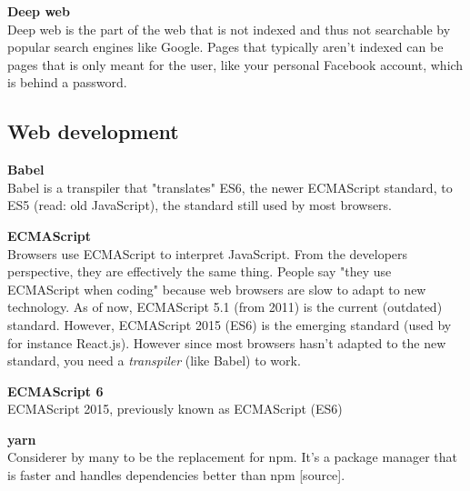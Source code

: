 \textbf{Deep web} \\
Deep web is the part of the web that is not indexed and thus not searchable by popular search engines like Google. Pages that typically aren't indexed can be pages that is only meant for the user, like your personal Facebook account, which is behind a password.

\subsection{Web development}                                %
\textbf{Babel} \\
Babel is a transpiler that "translates" ES6, the newer ECMAScript standard, to ES5 (read: old JavaScript), the standard still used by most browsers. 

\textbf{ECMAScript} \\
Browsers use ECMAScript to interpret JavaScript. From the developers perspective, they are effectively the same thing. People say "they use ECMAScript when coding" because web browsers are slow to adapt to new technology. As of now, ECMAScript 5.1 (from 2011) is the current (outdated) standard. However, ECMAScript 2015 (ES6) is the emerging standard (used by for instance React.js). However since most browsers hasn't adapted to the new standard, you need a \textit{transpiler} (like Babel) to work.  

\textbf{ECMAScript 6 } \\
ECMAScript 2015, previously known as ECMAScript (ES6)



\textbf{yarn} \\
Considerer by many to be the replacement for npm. It's a package manager that is faster and handles dependencies better than npm [source].  